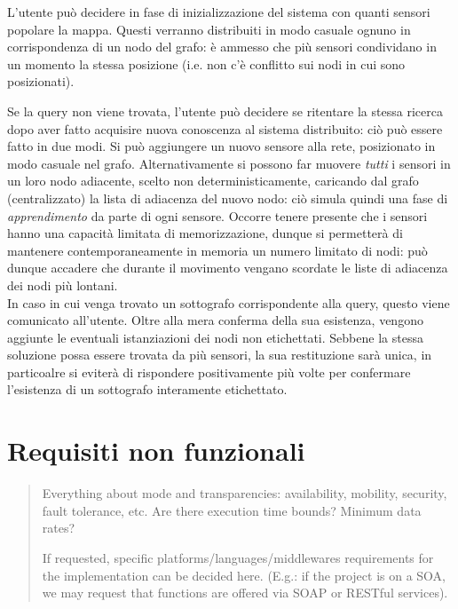 \documentclass{llncs}
\begin{document}
L'utente può decidere in fase di inizializzazione del sistema con quanti
sensori popolare la mappa. Questi verranno distribuiti in modo casuale
ognuno in corrispondenza di un nodo del grafo: è ammesso che più
sensori condividano in un momento la stessa posizione
(i.e. non c'è conflitto sui nodi in cui sono posizionati).


Se la query non viene trovata, l'utente può decidere se ritentare
la stessa ricerca dopo aver fatto acquisire nuova conoscenza al sistema
distribuito: ciò può essere fatto in due modi.
Si può aggiungere un nuovo sensore alla rete, posizionato in modo
casuale nel grafo. Alternativamente
si possono far muovere \emph{tutti} i sensori in un loro nodo adiacente,
scelto non deterministicamente, caricando dal grafo (centralizzato)
la lista di adiacenza del nuovo nodo: ciò simula quindi una fase di
\emph{apprendimento} da parte di ogni sensore. Occorre tenere presente
che i sensori hanno una capacità limitata di memorizzazione,
dunque si permetterà di mantenere contemporaneamente in memoria un
numero limitato di nodi: può dunque accadere che durante il movimento
vengano scordate le liste di adiacenza dei nodi più lontani.
\\

In caso in cui venga trovato un sottografo corrispondente alla query,
questo viene comunicato all'utente.
Oltre alla mera conferma della sua esistenza, vengono aggiunte
le eventuali istanziazioni dei nodi non etichettati.
Sebbene la stessa soluzione possa essere trovata da più sensori,
la sua restituzione sarà unica, in particoalre si eviterà di rispondere
positivamente più volte per confermare l'esistenza di un sottografo
interamente etichettato.\\


\section{Requisiti non funzionali}
\label{sec:nonfunc-req}
\begin{quote}
  Everything about mode and transparencies:
  availability, mobility, security, fault tolerance, etc.
  Are there execution time bounds? Minimum data rates?

  If requested, specific platforms/languages/middlewares requirements
  for the implementation can be decided here.
  (E.g.: if the project is on a SOA, we may request that functions
  are offered via SOAP or RESTful services).
\end{quote}

\end{document}
